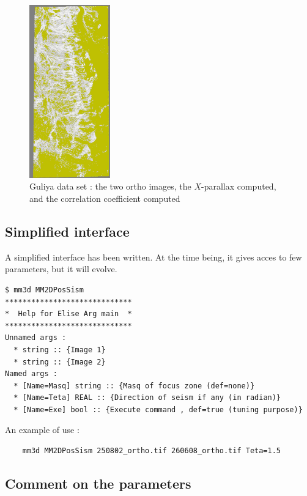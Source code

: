 \begin{figure}
\begin{center}
\includegraphics[width=35mm]{FIGS/SeismGuylia/Correl.jpg} %

\end{center}
\caption{Guliya data set : the two ortho images, the $X$-parallax computed, and the correlation
coefficient computed}
\label{FIG:OK:Guylia}
\end{figure}


\subsection{Simplified interface}

A simplified interface has been written. At the time being, it gives acces to few parameters, but 
it will evolve.

\begin{verbatim}
$ mm3d MM2DPosSism
*****************************
*  Help for Elise Arg main  *
*****************************
Unnamed args : 
  * string :: {Image 1}
  * string :: {Image 2}
Named args : 
  * [Name=Masq] string :: {Masq of focus zone (def=none)}
  * [Name=Teta] REAL :: {Direction of seism if any (in radian)}
  * [Name=Exe] bool :: {Execute command , def=true (tuning purpose)}
\end{verbatim}

An example of use :

\begin{verbatim}
    mm3d MM2DPosSism 250802_ortho.tif 260608_ortho.tif Teta=1.5
\end{verbatim}


\subsection{Comment on the parameters}

